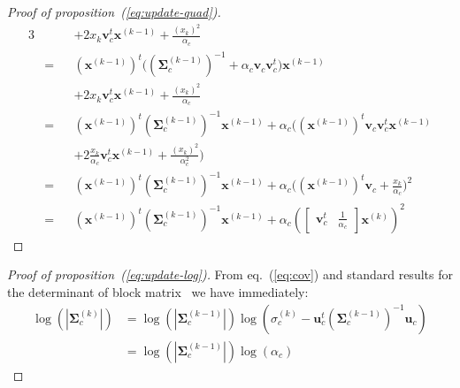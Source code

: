 \documentclass[journal,10pt]{IEEEtran}
\begin{document}
\begin{proof}[Proof of proposition~(\ref{eq:update-quad})]
\begin{alignat*}{3}
     & &&+ 2 x_k \mathbf{v}_c^t \mathbf{x}^{(k-1)} + \frac{(x_k)^2}{\alpha_c} \\
     &= &&(\mathbf{x}^{(k-1)})^t \Big((\boldsymbol{\Sigma}_c^{(k-1)})^{-1} + \alpha_c \mathbf{v}_c \mathbf{v}_c^t\Big) \mathbf{x}^{(k-1)}\\
     & &&+ 2 x_k \mathbf{v}_c^t \mathbf{x}^{(k-1)} + \frac{(x_k)^2}{\alpha_c} \\
     &= &&(\mathbf{x}^{(k-1)})^t (\boldsymbol{\Sigma}_c^{(k-1)})^{-1} \mathbf{x}^{(k-1)} + \alpha_c \Big( (\mathbf{x}^{(k-1)})^t \mathbf{v}_c \mathbf{v}_c^t \mathbf{x}^{(k-1)} \\
     & &&+ 2 \frac{x_k}{\alpha_c} \mathbf{v}_c^t \mathbf{x}^{(k-1)} + \frac{(x_k)^2}{\alpha_c^2}\Big) \\
     &= &&(\mathbf{x}^{(k-1)})^t (\boldsymbol{\Sigma}_c^{(k-1)})^{-1} \mathbf{x}^{(k-1)} + \alpha_c \Big( (\mathbf{x}^{(k-1)})^t \mathbf{v}_c + \frac{x_k}{\alpha_c} \Big)^2 \\
     &= &&(\mathbf{x}^{(k-1)})^t (\boldsymbol{\Sigma}_c^{(k-1)})^{-1} \mathbf{x}^{(k-1)} + \alpha_c ( \left[\begin{array}{cc} \mathbf{v}_c^t & \frac{1}{\alpha_c} \end{array}\right] \mathbf{x}^{(k)} )^2
    \end{alignat*}
\end{proof}

\begin{proof}[Proof of proposition~(\ref{eq:update-log})]

  From eq.~(\ref{eq:cov}) and standard results for the determinant of block matrix~\cite[Chapter 9]{IMM2012-03274} we have immediately:
  \begin{align*}
    \log \left(|\boldsymbol{\Sigma}_c^{(k)}|\right)  & = \log\left(|\boldsymbol{\Sigma}_c^{(k-1)}|\right)\log\left(\sigma^{(k)}_c  - \mathbf{u}_c^t (\boldsymbol{\Sigma}_c^{(k-1)})^{-1}  \mathbf{u}_c\right)\\
    &= \log\left(|\boldsymbol{\Sigma}_c^{(k-1)}|\right)\log\left(\alpha_c\right)
  \end{align*}
  
\end{proof}





\end{document}
